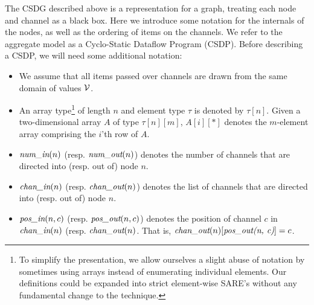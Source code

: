 The CSDG described above is a representation for a graph, treating
each node and channel as a black box.  Here we introduce some notation
for the internals of the nodes, as well as the ordering of items on
the channels.  We refer to the aggregate model as a Cyclo-Static
Dataflow Program (CSDP).  Before describing a CSDP, we will need some
additional notation:
\begin{itemize}

\item We assume that all items passed over channels are drawn from the
same domain of values ${\cal V}$.

\item An array type\footnote{To simplify the presentation, we allow
ourselves a slight abuse of notation by sometimes using arrays instead
of enumerating individual elements.  Our definitions could be expanded
into strict element-wise SARE's without any fundamental change to the
technique.} of length $n$ and element type $\tau$ is denoted by
$\tau[n]$.  Given a two-dimensional array $A$ of type $\tau[n][m]$,
$A[i][*]$ denotes the $m$-element array comprising the $i$'th row of
$A$.

\item $\mbox{\it num\_in}(n)$ (resp. $\mbox{\it num\_out}(n)$) denotes the number of
channels that are directed into (resp. out of) node $n$.

\item $\mbox{\it chan\_in}(n)$ (resp. $\mbox{\it chan\_out}(n)$) denotes the list of
channels that are directed into (resp. out of) node $n$.

\item $\mbox{\it pos\_in}(n, c)$ (resp. $\mbox{\it pos\_out}(n, c)$) denotes the
position of channel $c$ in $\mbox{\it chan\_in}(n)$
(resp. $\mbox{\it chan\_out}(n)$.  That is, $\mbox{\it chan\_out}(n)[\mbox{\it pos\_out(n,
c)}] = c$.

\end{itemize}

